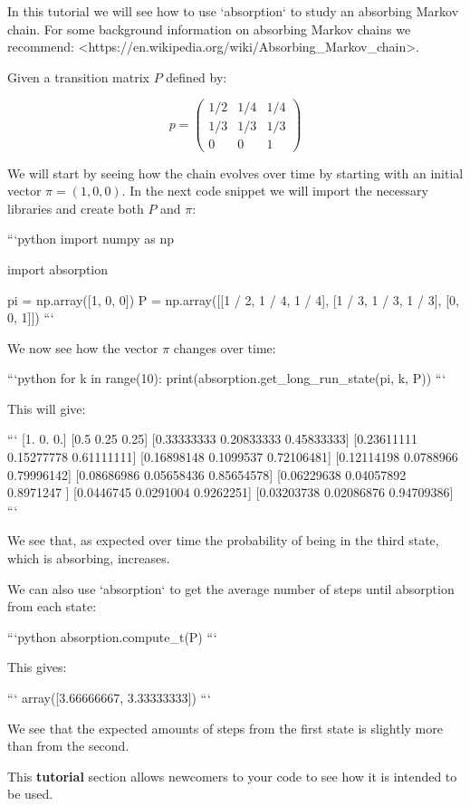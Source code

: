 \begin{md}

In this tutorial we will see how to use `absorption` to study an absorbing
Markov chain. For some background information on absorbing Markov chains we
recommend: <https://en.wikipedia.org/wiki/Absorbing_Markov_chain>.

Given a transition matrix $P$ defined by:

$$
p = \begin{pmatrix}
   1/2 & 1/4 & 1/4\\
   1/3 & 1/3 & 1/3\\
   0   & 0   & 1
    \end{pmatrix}
$$

We will start by seeing how the chain evolves over time by starting with an
initial vector $\pi=(1,0,0)$. In the next code snippet we will import the
necessary libraries and create both $P$ and $\pi$:

```python
import numpy as np

import absorption

pi = np.array([1, 0, 0])
P = np.array([[1 / 2, 1 / 4, 1 / 4], [1 / 3, 1 / 3, 1 / 3], [0, 0, 1]])
```

We now see how the vector $\pi$ changes over time:

```python
for k in range(10):
    print(absorption.get_long_run_state(pi, k, P))
```

This will give:

```
[1. 0. 0.]
[0.5  0.25 0.25]
[0.33333333 0.20833333 0.45833333]
[0.23611111 0.15277778 0.61111111]
[0.16898148 0.1099537  0.72106481]
[0.12114198 0.0788966  0.79996142]
[0.08686986 0.05658436 0.85654578]
[0.06229638 0.04057892 0.8971247 ]
[0.0446745 0.0291004 0.9262251]
[0.03203738 0.02086876 0.94709386]
```

We see that, as expected over time the probability of being in the third state,
which is absorbing, increases.

We can also use `absorption` to get the average number of steps until
absorption from each state:

```python
absorption.compute_t(P)
```

This gives:

```
array([3.66666667, 3.33333333])
```

We see that the expected amounts of steps from the first state is slightly more
than from the second.
\end{md}

This \textbf{tutorial} section allows newcomers to your code to see how it is intended
to be used.

